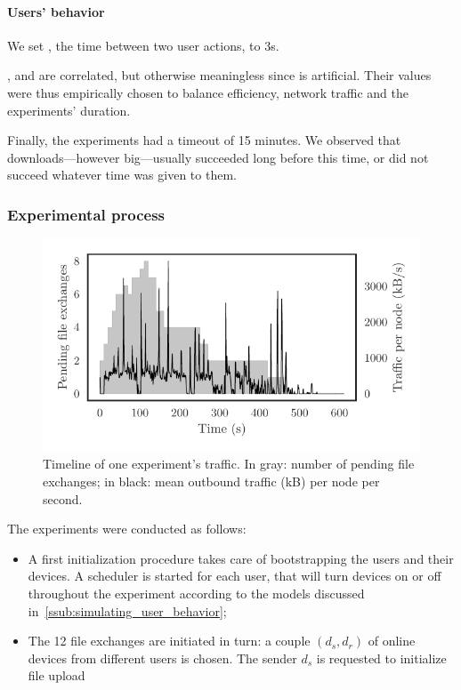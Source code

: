 \paragraph*{Users' behavior} We set \tuser, the time between two user actions, to 3s. 

\trps, \tupload and \tuser are correlated, but otherwise meaningless since \tuser is artificial. 
Their values were thus empirically chosen to balance efficiency, network traffic and the experiments' duration.

Finally, the experiments had a timeout of 15 minutes. 
We observed that downloads---however big---usually succeeded long before this time, or did not succeed whatever time was given to them.


\subsubsection{Experimental process} %
\label{ssub:experimental_process}

\begin{figure}[t]
  \centering
  \includegraphics[width=\columnwidth]{figures/bw_and_pending_files.pdf}

  \caption{\label{fig:bw_and_pending_files}Timeline of one experiment's traffic.
  In gray: number of pending file exchanges; in black: mean outbound traffic (kB) per node per second.}
\end{figure}

The experiments were conducted as follows: 
\begin{itemize}
  \item A first initialization procedure takes care of bootstrapping the users and their devices. 
  A scheduler is started for each user, that will turn devices on or off throughout the experiment according to the models discussed in~\ref{ssub:simulating_user_behavior};
  \item The 12 file exchanges are initiated in turn: a couple $(d_s, d_r)$ of online devices from different users is chosen.
  The sender $d_s$ is requested to initialize file upload
\end{itemize}


